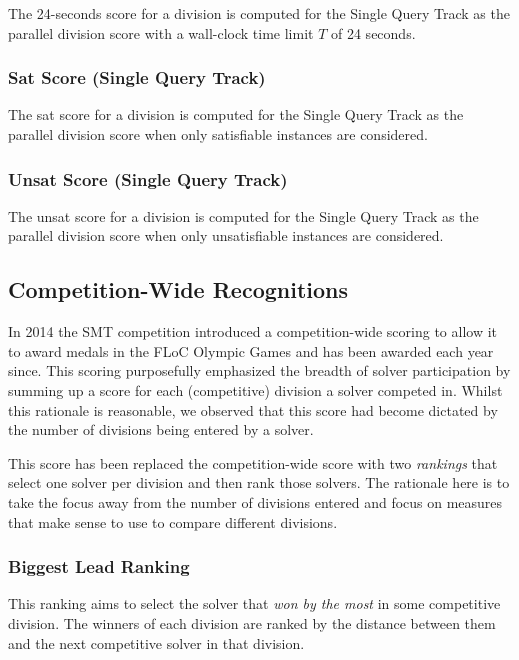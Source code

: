 \documentclass[12pt]{article}
\newcommand{\maintrack}{Single Query Track\xspace}
\begin{document}
The 24-seconds score for a division is computed for the \maintrack as the
parallel division score with a wall-clock time limit $T$ of 24 seconds.

\subsubsection{Sat Score (\maintrack)}

The sat score for a division is computed for the \maintrack as the
parallel division score when only satisfiable instances are considered.

\subsubsection{Unsat Score (\maintrack)}
The unsat score for a division is computed for the \maintrack as the
parallel division score when only unsatisfiable instances are considered.


\subsection{Competition-Wide Recognitions}

In 2014 the SMT competition introduced a competition-wide scoring to allow it to award medals in the FLoC Olympic Games and has been awarded each year since. This scoring purposefully emphasized the breadth of solver participation by summing up a score for each (competitive) division a solver competed in. Whilst this rationale is reasonable, we observed that this score had become dictated by the number of divisions being entered by a solver.

This score has been replaced the competition-wide score with two \emph{rankings} that select one solver per division and then rank those solvers. The rationale here is to take the focus away from the number of divisions entered and focus on measures that make sense to use to compare different divisions.

\subsubsection{Biggest Lead Ranking}

This ranking aims to select the solver that \emph{won by the most} in some competitive division. The winners of each division are ranked by the distance between them and the next competitive solver in that division.
\end{document}
